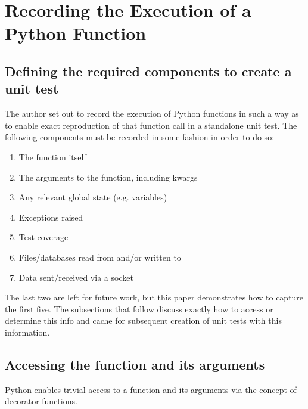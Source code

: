 \section{Recording the Execution of a Python Function}\label{sec:approach}

\subsection{Defining the required components to create a unit test}\label{sec:intro-1}

The author set out to record the execution of Python functions
in such a way as to enable exact reproduction of that 
function call in a standalone unit test.  The following components
must be recorded in some fashion in order to do so:
\begin{enumerate}
  \item The function itself
  \item The arguments to the function, including kwargs
  \item Any relevant global state (e.g. variables)
  \item Exceptions raised
  \item Test coverage
  \item Files/databases read from and/or written to
  \item Data sent/received via a socket
\end{enumerate}

The last two are left for future work, but this paper demonstrates how to capture 
the first five. The subsections that follow discuss exactly how to 
access or determine this info and cache for subsequent creation of unit tests
with this information.
\subsection{Accessing the function and its arguments}\label{sec:approach-internal-1}

Python enables trivial access to a function and 
its arguments via the concept of decorator functions.

